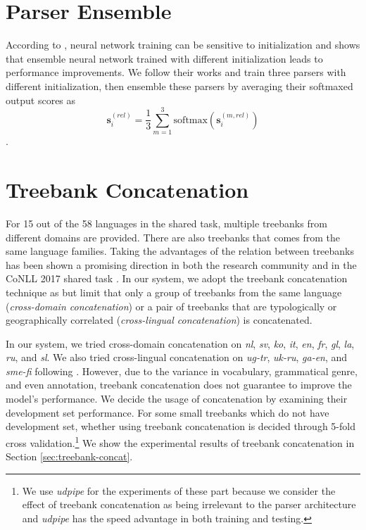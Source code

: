 \documentclass[11pt,a4paper]{article}
\begin{document}
\section{Parser Ensemble}\label{sec:ens}

According to \citet{reimers-gurevych:2017:EMNLP2017}, neural network training can
be sensitive to initialization and
\citet{DBLP:journals/corr/abs-1805-11224}  shows that ensemble
neural network trained with different initialization
leads to performance improvements.
We follow their works and train three parsers with different initialization,
then ensemble these parsers by averaging their softmaxed output scores as 
\[\mathbf{s}_i^{(rel)} = \frac{1}{3} \sum_{m=1}^{3} \text{softmax}(\mathbf{s}_i^{(m, rel)})\].

\section{Treebank Concatenation}\label{sec:comb}

For 15 out of the 58 languages in the shared task,
multiple treebanks from different domains are provided.
There are also treebanks that comes from the same language families.
Taking the advantages of the relation between treebanks has been shown 
a promising direction in both the research community \cite{TACL892,guo-EtAl:2015:ACL-IJCNLP2,C16-1002}
and in the CoNLL 2017 shared task \cite{che-EtAl:2017:K17-3,bjorkelund-EtAl:2017:K17-3,shi-EtAl:2017:K17-3}.
In our system, we adopt the treebank concatenation technique as \cite{TACL892}
but limit that only a group of treebanks from the same language (\textit{cross-domain concatenation})
or a pair of treebanks that are typologically or geographically correlated (\textit{cross-lingual concatenation})
is concatenated.

In our system, we tried cross-domain concatenation on
\textit{nl}, \textit{sv}, \textit{ko}, \textit{it}, \textit{en}, \textit{fr},
\textit{gl}, \textit{la}, \textit{ru}, and \textit{sl}.
We also tried cross-lingual concatenation on \textit{ug-tr}, \textit{uk-ru}, \textit{ga-en},
and \textit{sme-fi} following \cite{che-EtAl:2017:K17-3}.
However, due to the variance in vocabulary, grammatical genre, and even annotation, 
treebank concatenation does not guarantee to improve the model's performance.
We decide the usage of concatenation by examining their development set performance.
For some small treebanks which do not have development set, whether using treebank concatenation
is decided through 5-fold cross validation.\footnote{We use \textit{udpipe}
	for the experiments of these part
	because we consider the effect of treebank concatenation as
	being irrelevant to the parser architecture
	and \textit{udpipe} has the speed advantage in both training and testing.}
We show the experimental results of treebank concatenation
in Section \ref{sec:treebank-concat}.
\end{document}
